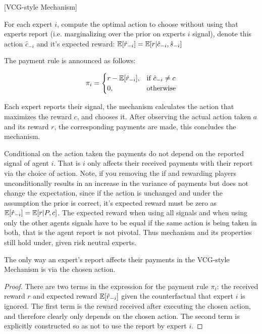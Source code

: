 \begin{mech}\label{mech:vcg-style}[VCG-style Mechanism]



For each expert $i$, compute the optimal action to choose without using that experts report (i.e. marginalizing over the prior on experts $i$ signal), denote this action $\hat{c}_{-i}$ and it's expected reward: $\operatorname*{\mathbb E}[\hat{r}_{-i}] = \operatorname*{\mathbb E}[ r| \hat{c}_{-i}, \hat{s}_{-i}] $


The payment rule is announced as follows:

\[
    \pi_i = 
\begin{cases}
    r - \expec[\hat{r}_{-i}] ,& \text{if } \hat{c}_{-i} \neq c\\
    0,              & \text{otherwise}
\end{cases}
\]

%

Each expert reports their signal, the mechanism calculates the action that maximizes the reward $c$, and chooses it. After observing the actual action taken $a$ and its reward $r$, the corresponding payments are made, this concludes the mechanism.

\end{mech}


Conditional on the action taken the payments do not depend on the reported signal of agent $i$.
That is $i$ only affects their received payments with their report via the choice of action. 
Note, if you removing the if and rewarding players unconditionally results in an increase in the variance of payments but does not change the expectation, since if the action is unchanged and under the assumption the prior is correct, it's expected reward must be zero as $\operatorname*{\mathbb E}[\hat{r}_{-i}] = \operatorname*{\mathbb E}[r|P,c]$. 
The expected reward when using all signals and when using only the other agents signals have to be equal if the same action is being taken in both, that is the agent report is not pivotal. 
Thus  mechanism and its properties still hold under, given risk neutral experts. 


\begin{lem}\label{lem:affect}
	The only way an expert's report affects their payments in the VCG-style Mechanism is via the chosen action.
\end{lem}

\begin{proof}
There are two terms in the expression for the payment rule $\pi_i$: the received reward $r$ and expected reward $\operatorname*{\mathbb E}[\hat{r}_{-i}]$ given the counterfactual that expert $i$ is ignored. 
The first term is the reward received after executing the chosen action, and therefore clearly only depends on the chosen action. 
The second term is explicitly constructed so as not to use the report by expert $i$. 
\end{proof}


